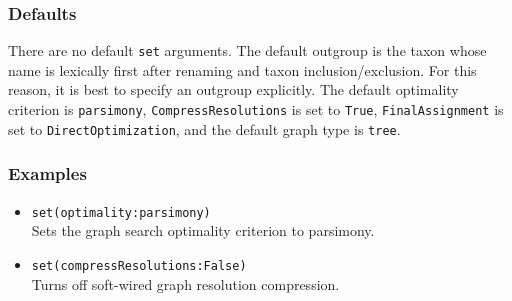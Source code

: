 \documentclass[11pt]{article}
\begin{document}
			
		
		\subsubsection{Defaults} 
		There are no default \texttt{set} arguments.  The default outgroup is the taxon whose name  is lexically first after
		renaming and taxon inclusion/exclusion. For this reason, it is best to specify an outgroup explicitly.
		The default optimality criterion is \texttt{parsimony}, \texttt{CompressResolutions} is set to \texttt{True}, \texttt{FinalAssignment} is set to \texttt{DirectOptimization}, and the default graph type is \texttt{tree}.
		\subsubsection{Examples}
			\begin{itemize}
					\item{\texttt{set(optimality:parsimony)}\\Sets the graph search optimality criterion to parsimony.}
					\item{\texttt{set(compressResolutions:False)}\\Turns off soft-wired graph resolution compression.}
			\end{itemize}
		
\end{document}
